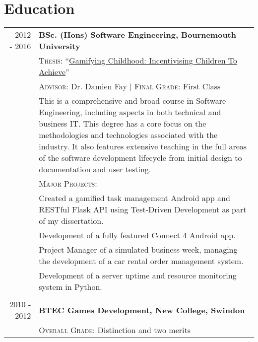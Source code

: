 \section{Education}
\begin{tabular}{r|p{11cm}}
	\ 2012 - 2016 & \textbf{BSc. (Hons) Software Engineering, Bournemouth University}\\ 
	\ & \textsc{Thesis}: ``\href{https://github.com/mikeporterdev/Dissertation/blob/master/digitalmain.pdf}{Gamifying Childhood: Incentivising Children To Achieve}'' \\
	\ & \textsc{Advisor}: Dr. Damien Fay | \normalsize \textsc{Final Grade}: First Class \\
	\ & \footnotesize This is a comprehensive and broad course in Software Engineering, including aspects in both technical and business IT. This degree has a core focus on the methodologies and technologies associated with the industry. It also features extensive teaching in the full areas of the software development lifecycle from initial design to documentation and user testing. \\
	\ & \vspace{1pt}  \textsc{Major Projects}: \\
	\ &	\tabitem Created a gamified task management Android app and RESTful Flask API using Test-Driven Development as part of my dissertation. \\
	\ & \tabitem Development of a fully featured Connect 4 Android app. \\
	\ & \tabitem Project Manager of a simulated business week, managing the development of a car rental order management system. \\
	\ &	\tabitem Development of a server uptime and resource monitoring system in Python. \\

	\multicolumn{2}{c}{} \\


	2010 - 2012 & \textbf{BTEC Games Development, New College, Swindon}\\
	\ & \textsc{Overall Grade}: Distinction and two merits
\end{tabular}

